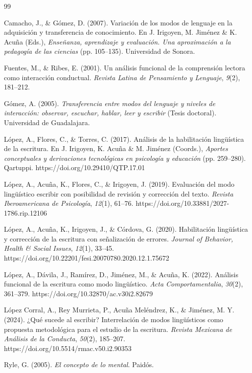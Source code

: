 \documentclass[12pt]{article}
\begin{document}
\begin{thebibliography}{99}

Camacho, J., \& Gómez, D. (2007). Variación de los modos de lenguaje en la adquisición y
transferencia de conocimiento. En J. Irigoyen, M. Jiménez \& K. Acuña (Eds.),
\emph{Enseñanza, aprendizaje y evaluación. Una aproximación a la pedagogía de las ciencias}
(pp. 105--135). Universidad de Sonora.

Fuentes, M., \& Ribes, E. (2001). Un análisis funcional de la comprensión lectora como
interacción conductual. \emph{Revista Latina de Pensamiento y Lenguaje}, \emph{9}(2), 181--212.

Gómez, A. (2005). \emph{Transferencia entre modos del lenguaje y niveles de interacción:
observar, escuchar, hablar, leer y escribir} (Tesis doctoral). Universidad de Guadalajara.

López, A., Flores, C., \& Torres, C. (2017). Análisis de la habilitación lingüística de la
escritura. En J. Irigoyen, K. Acuña \& M. Jiménez (Coords.), \emph{Aportes conceptuales y
derivaciones tecnológicas en psicología y educación} (pp. 259--280). Qartuppi.
https://doi.org/10.29410/QTP.17.01

López, A., Acuña, K., Flores, C., \& Irigoyen, J. (2019). Evaluación del modo lingüístico
escribir con posibilidad de revisión y corrección del texto.
\emph{Revista Iberoamericana de Psicología}, \emph{12}(1), 61--76.
https://doi.org/10.33881/2027-1786.rip.12106

López, A., Acuña, K., Irigoyen, J., \& Córdova, G. (2020). Habilitación lingüística y
corrección de la escritura con señalización de errores. \emph{Journal of Behavior, Health \&
Social Issues}, \emph{12}(1), 33--45.
https://doi.org/10.22201/fesi.20070780.2020.12.1.75672

López, A., Dávila, J., Ramírez, D., Jiménez, M., \& Acuña, K. (2022). Análisis funcional de
la escritura como modo lingüístico. \emph{Acta Comportamentalia}, \emph{30}(2), 361--379.
https://doi.org/10.32870/ac.v30i2.82679

López Corral, A., Rey Murrieta, P., Acuña Meléndrez, K., \& Jiménez, M. Y. (2024). ¿Qué
sucede al escribir? Interrelación de modos lingüísticos como propuesta metodológica para el
estudio de la escritura. \emph{Revista Mexicana de Análisis de la Conducta}, \emph{50}(2),
185--207. https://doi.org/10.5514/rmac.v50.i2.90353

Ryle, G. (2005). \emph{El concepto de lo mental}. Paidós.

\end{thebibliography}
\end{document}

